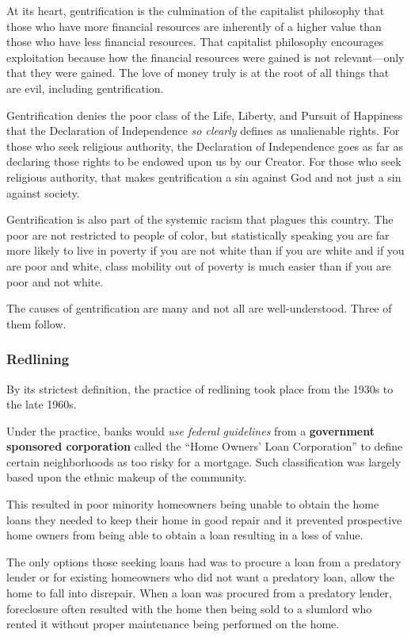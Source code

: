 At its heart, gentrification is the culmination of the capitalist philosophy that those who have more financial resources are inherently of a higher value than those who have less financial resources. That capitalist philosophy encourages exploitation because how the financial resources were gained is not relevant---only that they were gained. The love of money truly is at the root of all things that are evil, including gentrification.

Gentrification denies the poor class of the Life, Liberty, and Pursuit of Happiness that the Declaration of Independence \emph{so clearly} defines as unalienable rights. For those who seek religious authority, the Declaration of Independence goes as far as declaring those rights to be endowed upon us by our Creator. For those who seek religious authority, that makes gentrification a sin against God and not just a sin against society.

Gentrification is also part of the systemic racism that plagues this country. The poor are not restricted to people of color, but statistically speaking you are far more likely to live in poverty if you are not white than if you are white and if you are poor and white, class mobility out of poverty is much easier than if you are poor and not white.

The causes of gentrification are many and not all are well-understood. Three of them follow.

\subsubsection{Redlining}

By its strictest definition, the practice of redlining took place from the 1930s to the late 1960s.

Under the practice, banks would \emph{use federal guidelines} from a \textbf{government sponsored corporation} called the ``Home Owners' Loan Corporation'' to define certain neighborhoods as too risky for a mortgage. Such classification was largely based upon the ethnic makeup of the community.

This resulted in poor minority homeowners being unable to obtain the home loans they needed to keep their home in good repair and it prevented prospective home owners from being able to obtain a loan resulting in a loss of value.

The only options those seeking loans had was to procure a loan from a predatory lender or for existing homeowners who did not want a predatory loan, allow the home to fall into disrepair. When a loan was procured from a predatory lender, foreclosure often resulted with the home then being sold to a slumlord who rented it without proper maintenance being performed on the home.

